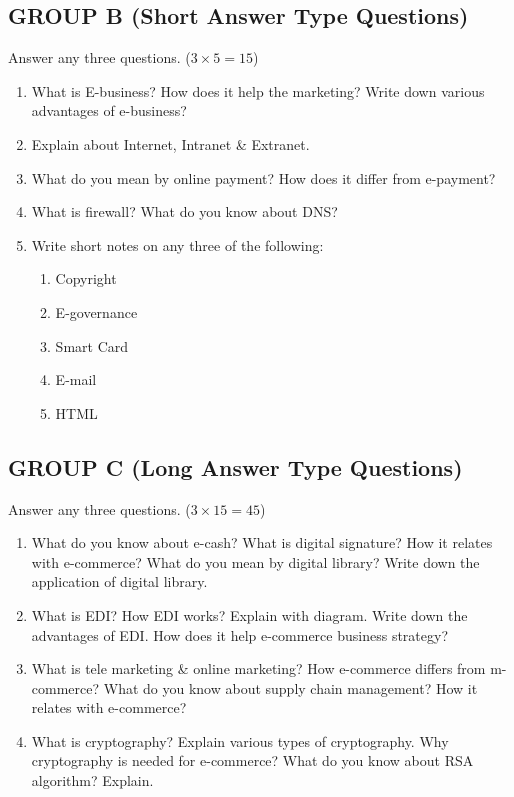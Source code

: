 \subsection*{GROUP B (Short Answer Type Questions)}
Answer any three questions. ($3 \times 5 = 15$)
\begin{enumerate}
    \item[2.] What is E-business? How does it help the marketing? Write down various advantages of e-business?
    \item[3.] Explain about Internet, Intranet \& Extranet.
    \item[4.] What do you mean by online payment? How does it differ from e-payment?
    \item[5.] What is firewall? What do you know about DNS?
    \item[6.] Write short notes on any three of the following:
    \begin{enumerate}
        \item[a)] Copyright
        \item[b)] E-governance
        \item[c)] Smart Card
        \item[d)] E-mail
        \item[e)] HTML
    \end{enumerate}
\end{enumerate}

\subsection*{GROUP C (Long Answer Type Questions)}
Answer any three questions. ($3 \times 15 = 45$)
\begin{enumerate}
    \item[7.] What do you know about e-cash? What is digital signature? How it relates with e-commerce? What do you mean by digital library? Write down the application of digital library.
    \item[8.] What is EDI? How EDI works? Explain with diagram. Write down the advantages of EDI. How does it help e-commerce business strategy?
    \item[9.] What is tele marketing \& online marketing? How e-commerce differs from m-commerce? What do you know about supply chain management? How it relates with e-commerce?
    \item[10.] What is cryptography? Explain various types of cryptography. Why cryptography is needed for e-commerce? What do you know about RSA algorithm? Explain.
\end{enumerate}

